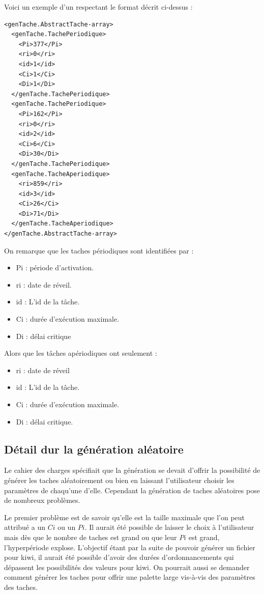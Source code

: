 Voici un exemple d'un respectant le format décrit ci-dessus : 

\begin{lstlisting}
<genTache.AbstractTache-array>
  <genTache.TachePeriodique>
    <Pi>377</Pi>
    <ri>0</ri>
    <id>1</id>
    <Ci>1</Ci>
    <Di>1</Di>
  </genTache.TachePeriodique>
  <genTache.TachePeriodique>
    <Pi>162</Pi>
    <ri>0</ri>
    <id>2</id>
    <Ci>6</Ci>
    <Di>30</Di>
  </genTache.TachePeriodique>
  <genTache.TacheAperiodique>
    <ri>859</ri>
    <id>3</id>
    <Ci>26</Ci>
    <Di>71</Di>
  </genTache.TacheAperiodique>
</genTache.AbstractTache-array>
\end{lstlisting}
On remarque que les taches périodiques sont identifiées par : 
\begin{itemize}
\item
Pi : période d'activation.
\item
ri : date de réveil.
\item
id : L'id de la tâche.
\item
Ci : durée d'exécution maximale.
\item
Di  : délai critique
\end{itemize} 
Alors que les tâches apériodiques ont seulement : 
\begin{itemize}
\item
ri  : date de réveil
\item
id : L'id de la tâche.
\item
Ci : durée d'exécution maximale.
\item
Di : délai critique.
\end{itemize} 
\subsection{Détail dur la génération aléatoire}
Le cahier des charges spécifiait que la génération se devait d'offrir la possibilité de générer les taches aléatoirement ou bien en laissant l'utilisateur choisir les paramètres de chaqu'une d'elle. Cependant la génération de taches aléatoires pose de nombreux problèmes.

Le premier problème est de savoir qu'elle est la taille maximale que l'on peut attribué a un $Ci$ ou un $Pi$. Il aurait été possible de laisser le choix à l'utilisateur mais dès que le nombre de taches est grand ou que leur $Pi$ est grand, l'hyperpériode explose. L'objectif étant par la suite de pouvoir générer un fichier pour kiwi, il aurait été possible d'avoir des durées d'ordonnancements qui dépassent les possibilités des valeurs pour kiwi. On pourrait aussi se demander comment générer les taches pour offrir une palette large vis-à-vis des paramètres des taches.


